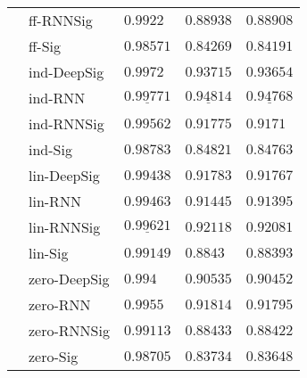 \begin{tabular}{lllll}
       & ff-RNNSig &                            $ 0.9922 $ &                           $ 0.88938 $ &                           $ 0.88908 $ \\
       & ff-Sig &                           $ 0.98571 $ &                           $ 0.84269 $ &                           $ 0.84191 $ \\
       & ind-DeepSig &                $  \mathbf{ 0.9972 } $ &               $  \mathbf{ 0.93715 } $ &               $  \mathbf{ 0.93654 } $ \\
       & ind-RNN &  $  \mathbf{ \underline{ 0.99771 }} $ &  $  \mathbf{ \underline{ 0.94814 }} $ &  $  \mathbf{ \underline{ 0.94768 }} $ \\
       & ind-RNNSig &                           $ 0.99562 $ &                           $ 0.91775 $ &                            $ 0.9171 $ \\
       & ind-Sig &                           $ 0.98783 $ &                           $ 0.84821 $ &                           $ 0.84763 $ \\
       & lin-DeepSig &                           $ 0.99438 $ &                           $ 0.91783 $ &                           $ 0.91767 $ \\
       & lin-RNN &                           $ 0.99463 $ &                           $ 0.91445 $ &                           $ 0.91395 $ \\
       & lin-RNNSig &            $  \underline{ 0.99621 } $ &                           $ 0.92118 $ &                           $ 0.92081 $ \\
       & lin-Sig &                           $ 0.99149 $ &                            $ 0.8843 $ &                           $ 0.88393 $ \\
       & zero-DeepSig &                             $ 0.994 $ &                           $ 0.90535 $ &                           $ 0.90452 $ \\
       & zero-RNN &                            $ 0.9955 $ &                           $ 0.91814 $ &                           $ 0.91795 $ \\
       & zero-RNNSig &                           $ 0.99113 $ &                           $ 0.88433 $ &                           $ 0.88422 $ \\
       & zero-Sig &                           $ 0.98705 $ &                           $ 0.83734 $ &                           $ 0.83648 $ \\
\bottomrule
\end{tabular}
